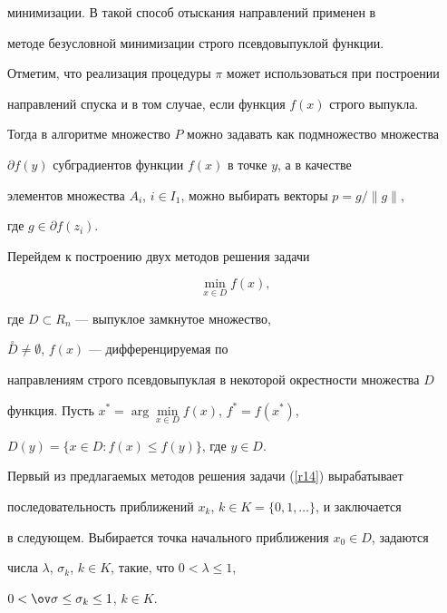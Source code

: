 минимизации. В \cite{b3} такой способ отыскания направлений применен в


методе безусловной минимизации строго псевдовыпуклой функции.





Отметим, что реализация процедуры $\pi$ может использоваться при построении


направлений спуска и в том случае, если функция $f(x)$ строго выпукла.


Тогда в алгоритме множество $P$ можно задавать как подмножество множества


$\partial f(y)$ субградиентов функции $f(x)$ в точке $y$, а в качестве


элементов множества $A_i$, $i\in I_1$, можно выбирать векторы $p=g/\|g\|$,


где $g\in \partial f(z_i)$.





Перейдем к построению двух методов решения задачи




\begin{equation} \label{r14}


\min_{x\in D} f(x),


\end{equation}


%


где $D\subset R_n$ --- выпуклое замкнутое множество,


$\overset{\circ}{D}{} \ne \emptyset$, $f(x)$ --- дифференцируемая по


направлениям строго псевдовыпуклая в некоторой окрестности множества $D$


функция. Пусть $x^*= \arg\min \limits_{x\in D} f(x)$, $f^*=f(x^*)$,


$D(y)=\{x\in D: f(x)\le f(y)\}$, где $y\in D$.





Первый из предлагаемых методов решения задачи (\ref{r14}) вырабатывает


последовательность приближений $x_k$, $k\in K=\{0,1,\dotsc\}$, и заключается


в следующем. Выбирается точка начального приближения $x_0\in D$, задаются


числа $\lambda$, $\sigma_k$, $k\in K$, такие, что $0<\lambda \le 1$,


$0<\ov \sigma \le \sigma_k \le 1$, $k\in K$.


